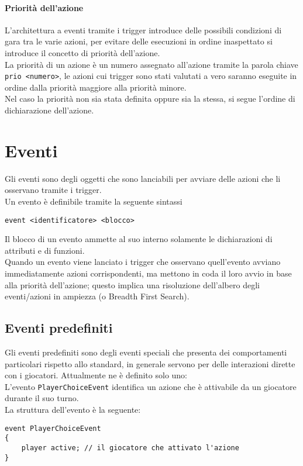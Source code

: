 \paragraph{Priorità dell'azione}
L'architettura a eventi tramite i trigger introduce delle possibili condizioni di gara tra le varie azioni,
per evitare delle esecuzioni in ordine inaspettato si introduce il concetto di priorità dell'azione. \\
La priorità di un azione è un numero assegnato all'azione tramite la parola chiave \lstinline|prio <numero>|,
le azioni cui trigger sono stati valutati a vero saranno eseguite in ordine dalla priorità maggiore
alla priorità minore. \\
Nel caso la priorità non sia stata definita oppure sia la stessa, si segue l'ordine di dichiarazione dell'azione.

\section{Eventi}
Gli eventi sono degli oggetti che sono lanciabili per avviare delle azioni che li osservano tramite i trigger. \\
Un evento è definibile tramite la seguente sintassi
\begin{lstlisting}
event <identificatore> <blocco>
\end{lstlisting}
Il blocco di un evento ammette al suo interno solamente le dichiarazioni di attributi e di funzioni. \\
Quando un evento viene lanciato i trigger che osservano quell'evento avviano immediatamente azioni corrispondenti,
ma mettono in coda il loro avvio in base alla priorità dell'azione; questo implica
una risoluzione dell'albero degli eventi/azioni in ampiezza (o Breadth First Search).

\subsection{Eventi predefiniti}
Gli eventi predefiniti sono degli eventi speciali che presenta dei comportamenti particolari rispetto 
allo standard, in generale servono per delle interazioni dirette con i giocatori.
Attualmente ne è definito solo uno: \\
L'evento \lstinline|PlayerChoiceEvent| identifica un azione che è attivabile da un giocatore durante il suo turno. \\
La struttura dell'evento è la seguente:
\begin{lstlisting}
event PlayerChoiceEvent
{
    player active; // il giocatore che attivato l'azione
}
\end{lstlisting}

